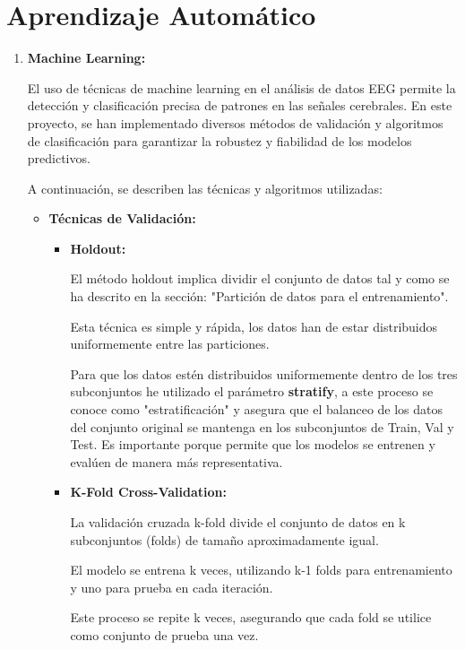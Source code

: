 \section{Aprendizaje Automático}


\begin{enumerate}
\def\labelenumi{\arabic{enumi}.}
\item
\textbf{Machine Learning:}

El uso de técnicas de machine learning en el análisis de datos EEG permite la detección y clasificación precisa de patrones en las señales cerebrales. En este proyecto, se han implementado diversos métodos de validación y algoritmos de clasificación para garantizar la robustez y fiabilidad de los modelos predictivos. 

A continuación, se describen las técnicas y algoritmos utilizadas:


\begin{itemize}

\item
\textbf{Técnicas de Validación:}

	\begin{itemize}
	
	\item
	\textbf{Holdout:}
	
	El método holdout implica dividir el conjunto de datos tal y como se ha descrito en la sección: "Partición de datos para el entrenamiento".
	
	
	Esta técnica es simple y rápida, los datos han de estar distribuidos uniformemente entre las particiones.
	
	Para que los datos estén distribuidos uniformemente dentro de los tres subconjuntos he utilizado el parámetro \textbf{stratify}, a este proceso se conoce como "estratificación" y asegura que el balanceo de los datos del conjunto original se mantenga en los subconjuntos de Train, Val y Test. Es importante porque permite que los modelos se entrenen y evalúen de manera más representativa.
	
	

	\item
	\textbf{K-Fold Cross-Validation:}
	
	
	La validación cruzada k-fold divide el conjunto de datos en k subconjuntos (folds) de tamaño aproximadamente igual.
	
	El modelo se entrena k veces, utilizando k-1 folds para entrenamiento y uno para prueba en cada iteración.
	
	Este proceso se repite k veces, asegurando que cada fold se utilice como conjunto de prueba una vez.
	

\end{itemize}
\end{itemize}
\end{enumerate}
